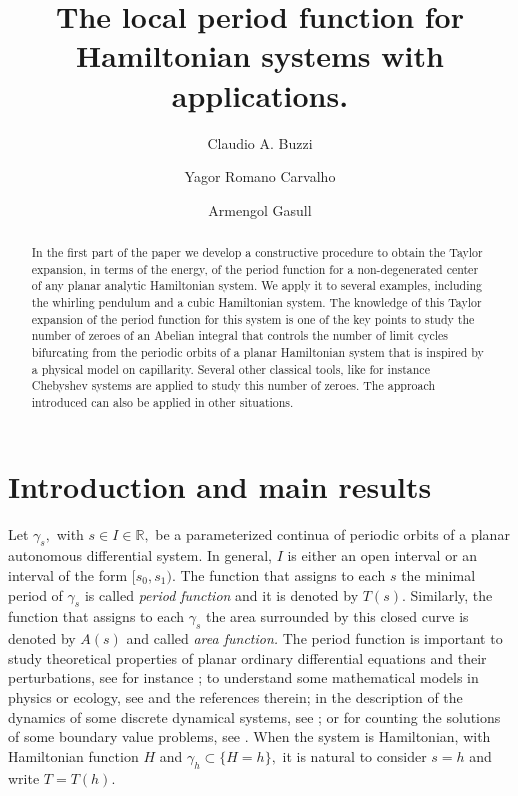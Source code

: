 \documentclass[12pt,a4paper,reqno]{amsart}
\date{}
\title[The period function with applications]{The local period function for Hamiltonian systems with applications.}
\author[C. A. Buzzi]{Claudio A. Buzzi}
\author[Y. R. Carvalho]{Yagor Romano Carvalho}
\author[A. Gasull]{Armengol Gasull}
\newcommand{\R}{\mathbb{R}}
\begin{document}
    \begin{abstract}
In the first part of the paper we develop a constructive procedure
to obtain the Taylor expansion, in terms of the energy, of the
period function for a non-degenerated center of any planar analytic
Hamiltonian system. We apply it to several examples, including the
whirling pendulum and a cubic Hamiltonian system.  The knowledge of
this Taylor expansion of the period function for this system  is one
of the key points to study the number of zeroes of an Abelian
integral that controls the number of limit cycles bifurcating from
the periodic orbits of a planar Hamiltonian system that is inspired
by a physical model on capillarity. Several other classical tools,
like for instance Chebyshev systems are applied to study this number
of zeroes. The approach introduced can also be applied in other
situations.
    \end{abstract}



    \maketitle


    \section{Introduction and main results}

Let $\gamma_s,$ with $s\in I\in\R,$ be a parameterized  continua of
periodic orbits of a planar autonomous differential system. In
general, $I$ is either an open interval or an interval of the form
$[s_0,s_1).$ The function that assigns to each $s$ the minimal
period of $\gamma_s$ is called {\it period function} and it is
denoted by $T(s).$ Similarly, the function that assigns to each
$\gamma_s$ the area surrounded by this closed curve is denoted by
$A(s)$ and  called {\it area function.} The period function is
 important to study theoretical properties of
planar ordinary differential equations and their perturbations, see
for instance \cite[ pp. 369-370]{ChoHal1982}; to understand some
mathematical models in physics or ecology, see \cite{ConVil2008,
FreGasGui2004, Rot1985, Wal1986} and the references therein;   in
the description of the dynamics of some discrete dynamical systems,
see \cite{BeuCus1998, CimGasMan2008, CimGasMan2015}; or for counting
the solutions of some boundary value problems, see \cite{Chi1987,
Chi1988}. When the system is Hamiltonian, with Hamiltonian function
$H$ and $\gamma_h\subset\{H=h\},$ it is natural to consider $s=h$
and write $T=T(h).$
\end{document}
